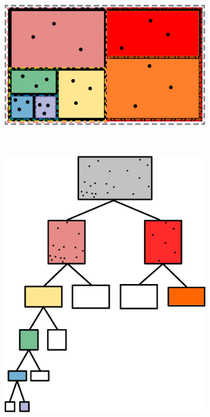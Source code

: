 \begin{figure}
        \centering
        \begin{subfigure}[b]{0.45\textwidth}
                \includegraphics[width=\textwidth]{graphics/tree.eps}
                \label{fig:volumetree}
        \end{subfigure}
        ~ 
        \begin{subfigure}[b]{0.45\textwidth}
                \includegraphics[width=\textwidth]{graphics/tree_memory.eps}

\end{subfigure}
\end{figure}
